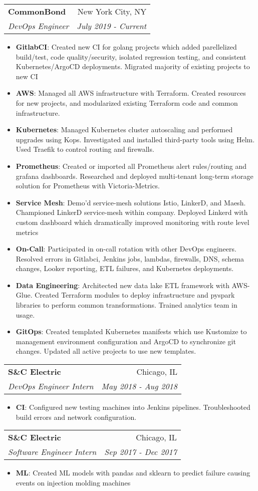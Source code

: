 \documentclass[letterpaper,11pt]{article}
\makeatletter
\newcommand{\resumeItem}[2]{
  \item\small{
    \textbf{#1}{: #2 \vspace{-1pt}}
  }
}
\newcommand{\resumeSubheading}[4]{
  \vspace{-4pt}\item
    \begin{tabular*}{0.97\textwidth}[t]{l@{\extracolsep{\fill}}r}
      \textbf{#1} & #2 \\
      \textit{\small#3} & \textit{\small #4} \\
    \end{tabular*}\vspace{-8pt}
}
\newcommand{\resumeItemListStart}{\begin{itemize}[leftmargin=*]}
\newcommand{\resumeItemListEnd}{\end{itemize}\vspace{-5pt}}
\makeatother
\begin{document}
  \resumeSubheading
  {CommonBond}{New York City, NY}
  {DevOps Engineer}{July 2019 - Current }
  \resumeItemListStart
      \resumeItem{GitlabCI}
        {Created new CI for golang projects which added parellelized build/test, code quality/security, isolated regression testing, and consistent Kubernetes/ArgoCD deployments. Migrated majority of existing projects to new CI}
      \resumeItem{AWS}
        {Managed all AWS infrastructure with Terraform. Created resources for new projects, and modularized existing Terraform code and common infrastructure.}
      \resumeItem{Kubernetes}
        {Managed Kubernetes cluster autoscaling and performed upgrades using Kops. Investigated and installed third-party tools using Helm. Used Traefik to control routing and firewalls.}
      \resumeItem{Prometheus}
        {Created or imported all Prometheus alert rules/routing and grafana dashboards. Researched and deployed multi-tenant long-term storage solution for Prometheus with Victoria-Metrics.}
      \resumeItem{Service Mesh}
        {Demo'd service-mesh solutions Istio, LinkerD, and Maesh. Championed LinkerD service-mesh within company. Deployed Linkerd with custom dashboard which dramatically improved monitoring with route level metrics}
      \resumeItem{On-Call}
        {Participated in on-call rotation with other DevOps engineers. Resolved errors in Gitlabci, Jenkins jobs, lambdas, firewalls, DNS, schema changes, Looker reporting, ETL failures, and Kubernetes deployments.}
      \resumeItem{Data Engineering}
        {Architected new data lake ETL framework with AWS-Glue. Created Terraform modules to deploy infrastructure and pyspark libraries to perform common transformations. Trained analytics team in usage.}
      \resumeItem{GitOps}
        {Created templated Kubernetes manifests which use Kustomize to management environment configuration and ArgoCD to synchronize git changes. Updated all active projects to use new templates.}
      \resumeItemListEnd

    \resumeSubheading
      {S\&C Electric}{Chicago, IL}
      {DevOps Engineer Intern}{May 2018 - Aug 2018}
      \resumeItemListStart
        \resumeItem{CI}
          {Configured new testing machines into Jenkins pipelines. Troubleshooted build errors and network configuration.}

      \resumeItemListEnd

      \resumeSubheading
      {S\&C Electric}{Chicago, IL}
      {Software Engineer Intern}{Sep 2017 - Dec 2017}
      \resumeItemListStart
        \resumeItem{ML}
          {Created ML models with pandas and sklearn to predict failure causing events on injection molding machines}
      \resumeItemListEnd
\end{document}
